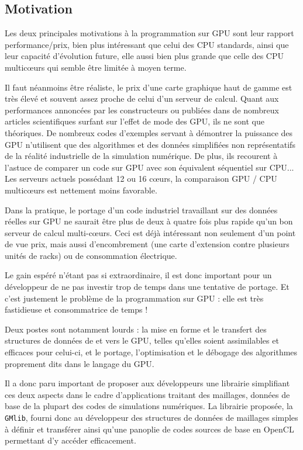 \documentclass[a4paper,12pt]{article}
\begin{document}
\subsection{Motivation}
Les deux principales motivations à la programmation sur GPU sont leur rapport performance/prix, bien plus intéressant que celui des CPU standards, ainsi que leur capacité d'évolution future, elle aussi bien plus grande que celle des CPU multic\oe urs qui semble être limitée à moyen terme.

Il faut néanmoins être réaliste, le prix d'une carte graphique haut de gamme est très élevé et souvent assez proche de celui d'un serveur de calcul. Quant aux performances annoncées par les constructeurs ou publiées dans de nombreux articles scientifiques surfant sur l'effet de mode des GPU, ils ne sont que théoriques. De nombreux codes d'exemples servant à démontrer la puissance des GPU n'utilisent que des algorithmes et des données simplifiées non représentatifs de la réalité industrielle de la simulation numérique. De plus, ils recourent à l'astuce de comparer un code sur GPU avec son équivalent séquentiel sur CPU... Les serveurs actuels possédant 12 ou 16 c\oe urs, la comparaison GPU / CPU multic\oe urs est nettement moins favorable.

Dans la pratique, le portage d'un code industriel travaillant sur des données réelles sur GPU ne saurait être plus de deux à quatre fois plus rapide qu'un bon serveur de calcul multi-c\oe urs. Ceci est déjà intéressant non seulement d'un point de vue prix, mais aussi d'encombrement (une carte d'extension contre plusieurs unités de racks) ou de consommation électrique.

Le gain espéré n'étant pas si extraordinaire, il est donc important pour un développeur de ne pas investir trop de temps dans une tentative de portage. Et c'est justement le problème de la programmation sur GPU : elle est très fastidieuse et consommatrice de temps !

Deux postes sont notamment lourds : la mise en forme et le transfert des structures de données de et vers le GPU, telles qu'elles soient assimilables et efficaces pour celui-ci, et le portage, l'optimisation et le débogage des algorithmes proprement dits dans le langage du GPU.

Il a donc paru important de proposer aux développeurs une librairie simplifiant ces deux aspects dans le cadre d'applications traitant des maillages, données de base de la plupart des codes de simulations numériques. La librairie proposée, la {\tt GMlib}, fourni donc au développeur des structures de données de maillages simples à définir et transférer ainsi qu'une panoplie de codes sources de base en OpenCL permettant d'y accéder efficacement.
\end{document}
